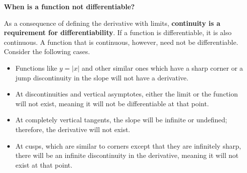 \textbf{When is a function not differentiable?}

As a consequence of defining the derivative with limits, \textbf{continuity is a requirement for differentiability}. If a function is differentiable, it is also continuous. A function that is continuous, however, need not be differentiable. Consider the following cases.

\begin{itemize}
    \item Functions like \( y = \vert x \vert \) and other similar ones which have a sharp corner or a jump discontinuity in the slope will not have a derivative.
    \item At discontinuities and vertical asymptotes, either the limit or the function will not exist, meaning it will not be differentiable at that point.
    \item At completely vertical tangents, the slope will be infinite or undefined; therefore, the derivative will not exist.
    \item At cusps, which are similar to corners except that they are infinitely sharp, there will be an infinite discontinuity in the derivative, meaning it will not exist at that point.
\end{itemize}

